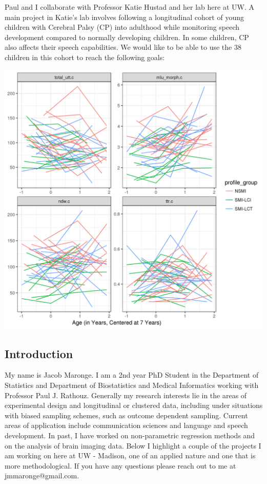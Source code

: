 \documentclass[12pt]{article}
\begin{document}
\begin{multicols}{2}
Paul and I collaborate with Professor Katie Hustad and her lab here at UW. A main project in Katie's lab involves following a longitudinal cohort of young children with Cerebral Palsy (CP) into adulthood while monitoring speech development compared to normally developing children. In some children, CP also affects their speech capabilities. We would like to be able to use the 38 children in this cohort to reach the following goals:
\begin{center}\vspace{.5cm}
\includegraphics[width=1\linewidth]{spaghetti_plots_for_speech_analysis.pdf}
\end{center}\vspace{.5cm}








\subsection*{Introduction}
My name is Jacob Maronge. I am a 2nd year PhD Student in the Department of Statistics and Department of Biostatistics and Medical Informatics working with Professor Paul J. Rathouz. Generally my research interests lie in the areas of experimental design and longitudinal or clustered data, including under situations with biased sampling schemes, such as outcome dependent sampling. Current areas of application include communication sciences and language and speech development. In past, I have worked on non-parametric regression methods and on the analysis of brain imaging data. Below I highlight a couple of the projects I am working on here at UW - Madison, one of an applied nature and one that is more methodological. If you have any questions please reach out to me at jmmaronge@gmail.com.

\end{multicols}
\end{document}
